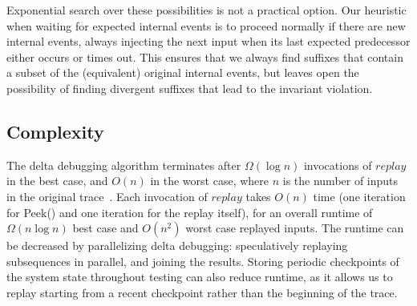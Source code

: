 Exponential search over these possibilities is not a practical option. Our heuristic when waiting for expected internal
events is to proceed normally if there are new internal events,
always injecting the next input when its last expected predecessor
either occurs or times out. This ensures that we always find suffixes that
contain a subset of the (equivalent) original internal events, but leaves open the
possibility of finding divergent suffixes that lead to the invariant
violation.


\subsection{Complexity}
\label{subsec:complexity}

The delta debugging algorithm terminates after $\Omega(\log n)$
invocations of $replay$ in the best case, and $O(n)$ in the worst case, where $n$ is the number of inputs in the original
trace~\cite{Zeller:1999:YMP:318773.318946}.
Each invocation of $replay$ takes $O(n)$ time
(one iteration for {\sc Peek()} and one iteration for the replay itself),
for an overall runtime of $\Omega(n \log n)$ best case and $O(n^2)$ worst case replayed inputs.
The runtime can be decreased by parallelizing delta debugging:
speculatively replaying subsequences in parallel, and joining the results.
Storing periodic checkpoints of the system state throughout testing can also reduce runtime, as it
allows us to replay starting from a recent checkpoint rather than the beginning of the
trace.%

